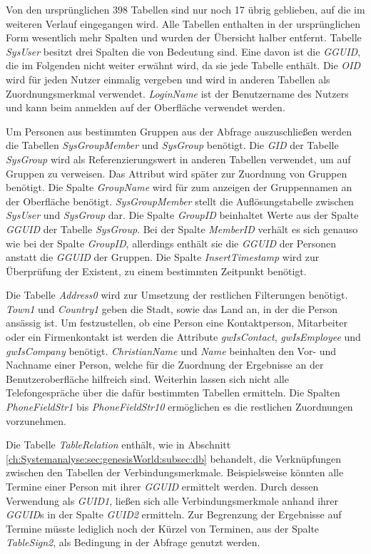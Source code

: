Von den ursprünglichen 398 Tabellen sind nur noch 17 übrig geblieben, auf die im weiteren Verlauf eingegangen wird. Alle Tabellen enthalten in der ursprünglichen Form wesentlich mehr Spalten und wurden der Übersicht halber entfernt. Tabelle \textit{SysUser} besitzt drei Spalten die von Bedeutung sind. Eine davon ist die \textit{GGUID}, die im Folgenden nicht weiter erwähnt wird, da sie jede Tabelle enthält. Die \textit{OID} wird für jeden Nutzer einmalig vergeben und wird in anderen Tabellen als Zuordnungsmerkmal verwendet. \textit{LoginName} ist der Benutzername des Nutzers und kann beim anmelden auf der Oberfläche verwendet werden. 

Um Personen aus bestimmten Gruppen aus der Abfrage auszuschließen werden die Tabellen \textit{SysGroupMember} und \textit{SysGroup} benötigt. Die \textit{GID} der Tabelle \textit{SysGroup} wird als Referenzierungswert in anderen Tabellen verwendet, um auf Gruppen zu verweisen. Das Attribut wird später zur Zuordnung von Gruppen benötigt. Die Spalte \textit{GroupName} wird für zum anzeigen der Gruppennamen an der Oberfläche benötigt.  \textit{SysGroupMember} stellt die Auflösungstabelle zwischen \textit{SysUser} und \textit{SysGroup} dar. Die Spalte \textit{GroupID} beinhaltet Werte aus der Spalte \textit{GGUID} der Tabelle \textit{SysGroup}. Bei der Spalte \textit{MemberID} verhält es sich genauso wie bei der Spalte \textit{GroupID}, allerdings enthält sie die \textit{GGUID} der Personen anstatt die \textit{GGUID} der Gruppen. Die Spalte \textit{InsertTimestamp} wird zur Überprüfung der Existent, zu einem bestimmten Zeitpunkt benötigt.

Die Tabelle \textit{Address0} wird zur Umsetzung der restlichen Filterungen benötigt. \textit{Town1} und \textit{Country1} geben die Stadt, sowie das Land an, in der die Person ansässig ist. Um festzustellen, ob eine Person eine Kontaktperson, Mitarbeiter oder ein Firmenkontakt ist werden die Attribute \textit{gwIsContact}, \textit{gwIsEmployee} und \textit{gwIsCompany} benötigt. \textit{ChristianName} und \textit{Name} beinhalten den Vor- und Nachname einer Person, welche für die Zuordnung der Ergebnisse an der Benutzeroberfläche hilfreich sind. Weiterhin lassen sich  nicht alle Telefongespräche über die dafür bestimmten Tabellen ermitteln. Die Spalten \textit{PhoneFieldStr1} bis \textit{PhoneFieldStr10} ermöglichen es die restlichen Zuordnungen vorzunehmen.

Die Tabelle \textit{TableRelation} enthält, wie in Abschnitt \ref{ch:Systemanalyse:sec:genesisWorld:subsec:db} behandelt, die Verknüpfungen zwischen den Tabellen der Verbindungsmerkmale. Beispielsweise könnten alle Termine einer Person mit ihrer \textit{GGUID} ermittelt werden. Durch dessen Verwendung als \textit{GUID1}, ließen sich alle Verbindungsmerkmale anhand ihrer \textit{GGUID}s in der Spalte \textit{GUID2} ermitteln. Zur Begrenzung der Ergebnisse auf Termine müsste lediglich noch der Kürzel von Terminen, aus der Spalte \textit{TableSign2}, als Bedingung in der Abfrage genutzt werden.

